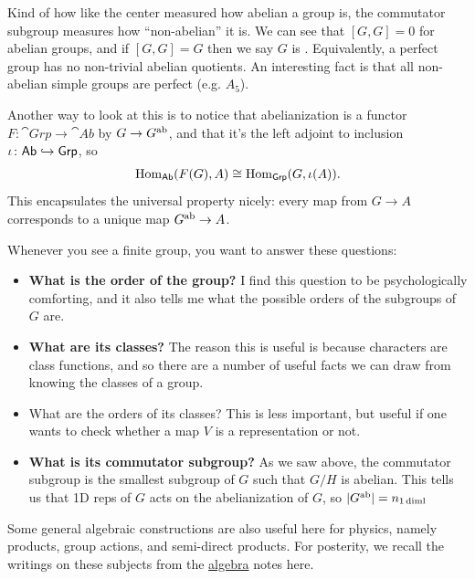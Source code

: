 \documentclass[11pt]{article}
\begin{document}
Kind of how like the center measured how abelian a group is, the commutator
subgroup measures how ``non-abelian'' it is. We can see that $[G, G] = 0$
for abelian groups, and if $[G, G] = G$ then we say $G$ is .
Equivalently, a perfect group has no non-trivial abelian quotients. An interesting
fact is that all non-abelian simple groups are perfect (e.g. $A_5$).

Another way to look at this is to notice that abelianization is a
functor $F \colon \cat{Grp} \to \cat{Ab}$ by $G \to G^{\rm ab}$, 
and that it's the left adjoint to inclusion $\iota \colon \text{\sffamily{Ab}} \hookrightarrow \text{\sffamily{Grp}}$, so
\begin{align*}
    \operatorname{Hom}_{\text{\sffamily{Ab}}}(F(G), A) \cong \operatorname{Hom}_{\text{\sffamily{Grp}}}(G, \iota(A)).
\end{align*}
This encapsulates the universal property nicely: every map from
$G \to A$ corresponds to a unique map $G^{\rm ab} \to A$. 

\begin{iidea}
    Whenever you see a finite group, you want to answer these questions:
    \begin{itemize}
        \item \textbf{What is the order of the group?} I find this question to be 
        psychologically comforting, and it also tells me what the possible 
        orders of the subgroups of $G$ are.
        \item \textbf{What are its classes?} The reason this is useful is because
        characters are class functions, and so there are a number of useful facts we can
        draw from knowing the classes of a group.
        \item What are the orders of its classes? This is less important, but useful
        if one wants to check whether a map $V$ is a representation or not.
        \item \textbf{What is its commutator subgroup?} As we saw above, the commutator
        subgroup is the smallest subgroup of $G$ such that $G/H$ is abelian.
        This tells us that 1D reps of $G$ acts on the abelianization of $G$,
        so $|G^{\rm ab}| = n_{1 \, \rm{diml}}$
    \end{itemize}
\end{iidea}

Some general algebraic constructions are also useful here
for physics, namely products, group actions, and semi-direct products.
For posterity, we recall the writings on these subjects from the 
\href{https://github.com/will-lancer/notes/blob/main/Mathematics/Algebra/Algebra.pdf}{algebra} 
notes here.
\end{document}
